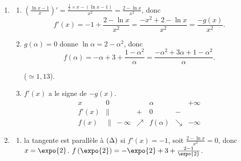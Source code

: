 \begin{enumerate}
\begin{enumerate}
				elles se coupent au point $\left(\expo{};3 - \expo{}\right)$.
		\end{enumerate}
		\item \begin{enumerate}
			\item {}
				$\left(\frac{\ln x - 1}{x}\right)' = \frac{\frac{1}{x}\times x - (\ln x - 1)}{x^2} = \frac{2 - \ln x}{x^2}$, donc
				\[
					f'(x) = -1 + \frac{2 - \ln x}{x^2} = \frac{-x^2 + 2 - \ln x}{x^2} = \frac{-g(x)}{x^2}.
				\]
			\item {}
				$g(\alpha) = 0$ donne $\ln\alpha = 2 - \alpha^2$, donc
				\[
					f(\alpha) = -\alpha + 3 + \frac{1 - \alpha^2}{\alpha} = \frac{-\alpha^2 + 3\alpha + 1 - \alpha^2}{\alpha}.
				\]

				 ($\simeq 1{,}13$).
			\item {} $f'(x)$ a le signe de $-g(x)$.
				\[
				\begin{array}{c|ccccc}
					x & 0 & & \alpha & & +\infty \\ \hline
					f'(x) & \| & + & 0 & - & \\ \hline
					f(x) & \| \; -\infty & \nearrow & f(\alpha) & \searrow & -\infty
				\end{array}
				\]
		\end{enumerate}
		\item \begin{enumerate}
			\item {}
				la tangente est parallèle à $(\Delta)$ si $f'(x) = -1$, soit $\frac{2 - \ln x}{x^2} = 0$, donc $x = \expo{2}$.
				$f\left(\expo{2}\right) = -\expo{2} + 3 + \frac{2 - 1}{\expo{2}}$.



\end{enumerate}
\end{enumerate}
